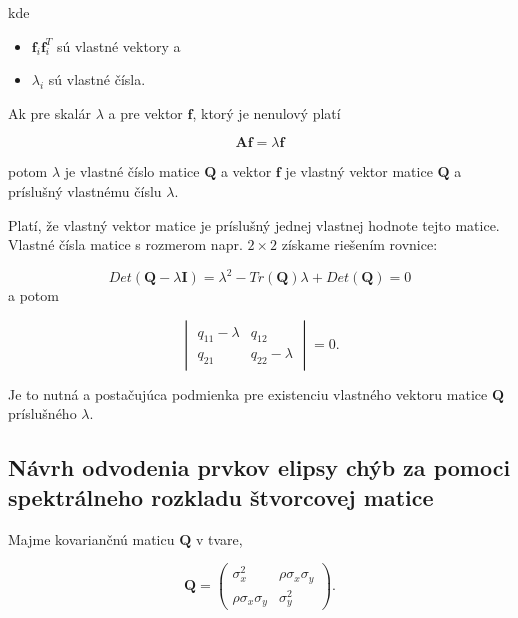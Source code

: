 kde
\begin{itemize}
\item $\mathbf{f}_{i}\mathbf{f}_{i}^{T}$ sú vlastné vektory a
\item $\lambda_{i}$ sú vlastné čísla.
\end{itemize}

Ak pre skalár $\lambda$ a pre vektor $\mathbf{f}$, ktorý je nenulový platí

\begin{equation}
\mathbf{Af} = \lambda\mathbf{f}
\end{equation}

potom $\lambda$ je vlastné číslo matice $\mathbf{Q}$ a vektor $\mathbf{f}$ je vlastný vektor matice $\mathbf{Q}$ a príslušný vlastnému číslu $\lambda$.

Platí, že vlastný vektor matice je príslušný jednej vlastnej hodnote tejto matice. Vlastné čísla matice s rozmerom napr. $2\times 2$ získame riešením rovnice:

\begin{equation}\label{rov:spec1}
Det\left(\mathbf{Q} - \lambda\mathbf{I}\right) = \lambda^2 - Tr(\mathbf{Q})\lambda + Det(\mathbf{Q}) = 0
\end{equation}
a potom

\begin{equation}\label{rov:spec2}
\begin{vmatrix} 
q_{11} - \lambda & q_{12}  \\ 
 q_{21} & q_{22} - \lambda 
 \end{vmatrix} = 0.
\end{equation}

Je to nutná a postačujúca podmienka pre existenciu vlastného vektoru matice $\mathbf{Q}$ príslušného $\lambda$.

\subsection{Návrh odvodenia prvkov elipsy chýb za pomoci spektrálneho rozkladu štvorcovej matice}

Majme kovariančnú maticu $\mathbf{Q}$ v tvare,

\begin{equation}
\mathbf{Q}=
\begin{pmatrix} 
\sigma_x^2 & \rho\sigma_{x} \sigma_{y}  \\ 
\rho\sigma_{x} \sigma_{y} & \sigma_{y}^2 
\end{pmatrix}.
\end{equation}


